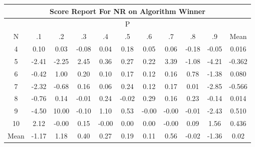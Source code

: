 \documentclass[11pt,a4paper]{report}
\begin{document}
\begin{longtable}{ | c || c | c | c | c | c | c | c | c | c || c |}
\hline
\multicolumn{11}{|c|}{ Score Report For NR on Algorithm Winner} \\
\hline
\multicolumn{11}{|c|}{ P } \\
\hline
N & .1 & .2 & .3 & .4 & .5 & .6 & .7 & .8 & .9 & Mean\\
 \hline
 \hline
 \endhead
  4 &  \cellcolor[HTML]{FFFFFF} 0.10 &  \cellcolor[HTML]{FFFFFF} 0.03 &  \cellcolor[HTML]{FFFFFF} -0.08 &  \cellcolor[HTML]{FFFFFF} 0.04 &  \cellcolor[HTML]{F7F7FF} 0.18 &  \cellcolor[HTML]{FFFFFF} 0.05 &  \cellcolor[HTML]{FFFFFF} 0.06 &  \cellcolor[HTML]{FFF7F7} -0.18 &  \cellcolor[HTML]{FFFFFF} -0.05 & 0.016 \\
  5 &  \cellcolor[HTML]{FFBFBF} -2.41 &  \cellcolor[HTML]{FFC7C7} -2.25 &  \cellcolor[HTML]{BFBFFF} 2.45 &  \cellcolor[HTML]{F7F7FF} 0.36 &  \cellcolor[HTML]{F7F7FF} 0.27 &  \cellcolor[HTML]{F7F7FF} 0.22 &  \cellcolor[HTML]{A7A7FF} 3.39 &  \cellcolor[HTML]{FFE7E7} -1.08 &  \cellcolor[HTML]{FF9797} -4.21 & -0.362 \\
  6 &  \cellcolor[HTML]{FFF7F7} -0.42 &  \cellcolor[HTML]{E7E7FF} 1.00 &  \cellcolor[HTML]{F7F7FF} 0.20 &  \cellcolor[HTML]{FFFFFF} 0.10 &  \cellcolor[HTML]{F7F7FF} 0.17 &  \cellcolor[HTML]{FFFFFF} 0.12 &  \cellcolor[HTML]{FFFFFF} 0.16 &  \cellcolor[HTML]{EFEFFF} 0.78 &  \cellcolor[HTML]{FFDFDF} -1.38 & 0.080 \\
  7 &  \cellcolor[HTML]{FFC7C7} -2.32 &  \cellcolor[HTML]{FFEFEF} -0.68 &  \cellcolor[HTML]{F7F7FF} 0.16 &  \cellcolor[HTML]{FFFFFF} 0.06 &  \cellcolor[HTML]{F7F7FF} 0.24 &  \cellcolor[HTML]{FFFFFF} 0.12 &  \cellcolor[HTML]{F7F7FF} 0.17 &  \cellcolor[HTML]{FFFFFF} 0.01 &  \cellcolor[HTML]{FFB7B7} -2.85 & -0.566 \\
  8 &  \cellcolor[HTML]{FFEFEF} -0.76 &  \cellcolor[HTML]{FFFFFF} 0.14 &  \cellcolor[HTML]{FFFFFF} -0.01 &  \cellcolor[HTML]{F7F7FF} 0.24 &  \cellcolor[HTML]{FFFFFF} -0.02 &  \cellcolor[HTML]{F7F7FF} 0.29 &  \cellcolor[HTML]{F7F7FF} 0.16 &  \cellcolor[HTML]{F7F7FF} 0.23 &  \cellcolor[HTML]{FFFFFF} -0.14 & 0.014 \\
  9 &  \cellcolor[HTML]{FF8F8F} -4.50 &  \cellcolor[HTML]{0808FF} 10.00 &  \cellcolor[HTML]{FFFFFF} -0.10 &  \cellcolor[HTML]{E7E7FF} 1.10 &  \cellcolor[HTML]{EFEFFF} 0.53 &  \cellcolor[HTML]{FFFFFF} -0.00 &  \cellcolor[HTML]{FFFFFF} -0.00 &  \cellcolor[HTML]{FFFFFF} -0.01 &  \cellcolor[HTML]{FFBFBF} -2.43 & 0.510 \\
  10 &  \cellcolor[HTML]{C7C7FF} 2.12 &  \cellcolor[HTML]{FFFFFF} -0.00 &  \cellcolor[HTML]{FFFFFF} 0.15 &  \cellcolor[HTML]{FFFFFF} -0.00 &  \cellcolor[HTML]{FFFFFF} 0.00 &  \cellcolor[HTML]{FFFFFF} 0.00 &  \cellcolor[HTML]{FFFFFF} -0.00 &  \cellcolor[HTML]{FFFFFF} 0.09 &  \cellcolor[HTML]{D7D7FF} 1.56 & 0.436 \\
 \hline
 \hline
Mean &  \cellcolor[HTML]{FFDFDF} -1.17 &  \cellcolor[HTML]{DFDFFF} 1.18 &  \cellcolor[HTML]{F7F7FF} 0.40 &  \cellcolor[HTML]{F7F7FF} 0.27 &  \cellcolor[HTML]{F7F7FF} 0.19 &  \cellcolor[HTML]{FFFFFF} 0.11 &  \cellcolor[HTML]{EFEFFF} 0.56 &  \cellcolor[HTML]{FFFFFF} -0.02 &  \cellcolor[HTML]{FFDFDF} -1.36 &  \cellcolor[HTML]{FFFFFF} 0.02
\end{longtable}
\end{document}
